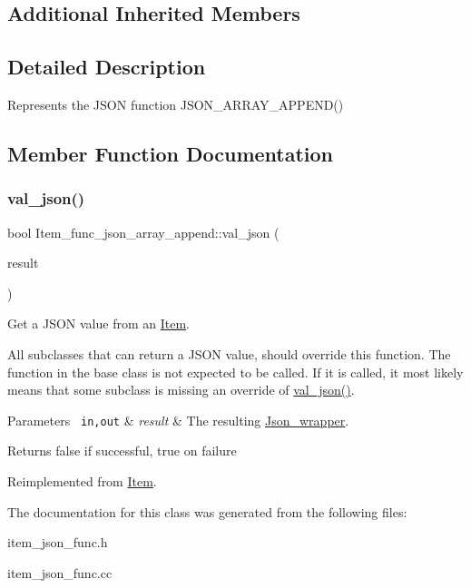 \subsection*{Additional Inherited Members}


\subsection{Detailed Description}
Represents the J\+S\+ON function J\+S\+O\+N\+\_\+\+A\+R\+R\+A\+Y\+\_\+\+A\+P\+P\+E\+N\+D() 

\subsection{Member Function Documentation}
\mbox{\label{classItem__func__json__array__append_ae3826106cb02273f4e06a924b0dcb09c}} 
\subsubsection{\texorpdfstring{val\+\_\+json()}{val\_json()}}
{\footnotesize\ttfamily bool Item\+\_\+func\+\_\+json\+\_\+array\+\_\+append\+::val\+\_\+json (\begin{DoxyParamCaption}\item[{\mbox{\hyperlink{classJson__wrapper}{Json\+\_\+wrapper}} $\ast$}]{result }\end{DoxyParamCaption})\hspace{0.3cm}{\ttfamily [virtual]}}

Get a J\+S\+ON value from an \mbox{\hyperlink{classItem}{Item}}.

All subclasses that can return a J\+S\+ON value, should override this function. The function in the base class is not expected to be called. If it is called, it most likely means that some subclass is missing an override of \mbox{\hyperlink{classItem__func__json__array__append_ae3826106cb02273f4e06a924b0dcb09c}{val\+\_\+json()}}.


\begin{DoxyParams}[1]{Parameters}
\mbox{\texttt{ in,out}}  & {\em result} & The resulting \mbox{\hyperlink{classJson__wrapper}{Json\+\_\+wrapper}}.\\
\hline
\end{DoxyParams}
\begin{DoxyReturn}{Returns}
false if successful, true on failure 
\end{DoxyReturn}


Reimplemented from \mbox{\hyperlink{classItem_a57e763fcde2d0a819d21e31c59611290}{Item}}.



The documentation for this class was generated from the following files\+:\begin{DoxyCompactItemize}
\item 
item\+\_\+json\+\_\+func.\+h\item 
item\+\_\+json\+\_\+func.\+cc\end{DoxyCompactItemize}
